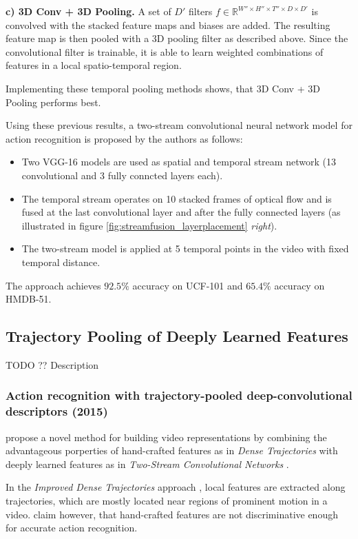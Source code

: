 \textbf{c) 3D Conv + 3D Pooling.}
A set of $D'$ filters $f \in \mathbb{R}^{W'' \times H'' \times T'' \times D \times D'}$ is convolved with the stacked feature maps and biases are added.
The resulting feature map is then pooled with a 3D pooling filter as described above.
Since the convolutional filter is trainable, it is able to learn weighted combinations of features in a local spatio-temporal region.

Implementing these temporal pooling methods shows, that 3D Conv + 3D Pooling performs best.

Using these previous results, a two-stream convolutional neural network model for action recognition is proposed by the authors as follows:
\begin{itemize}
    \item Two VGG-16 models \cite{simonyan_very_2014} are used as spatial and temporal stream network (13 convolutional and 3 fully conncted layers each).
    \item The temporal stream operates on 10 stacked frames of optical flow and is fused at the last convolutional layer and after the fully connected layers (as illustrated in figure \ref{fig:streamfusion_layerplacement} \textit{right}).
    \item The two-stream model is applied at 5 temporal points in the video with fixed temporal distance.
\end{itemize}

The approach achieves $92.5\%$ accuracy on UCF-101 and $65.4\%$ accuracy on HMDB-51.


\subsection{Trajectory Pooling of Deeply Learned Features}
TODO ?? Description

\subsubsection{Action recognition with trajectory-pooled deep-convolutional descriptors (2015)}
\textcite{wang_action_2015} propose a novel method for building video representations by combining the advantageous porperties of hand-crafted features as in \textit{Dense Trajectories} \cite{wang_action_2013} with deeply learned features as in \textit{Two-Stream Convolutional Networks} \cite{simonyan_two-stream_2014}.

In the \textit{Improved Dense Trajectories} approach \cite{wang_action_2013}, local features are extracted along trajectories, which are mostly located near regions of prominent motion in a video.
\textcite{wang_action_2015} claim however, that hand-crafted features are not discriminative enough for accurate action recognition.

